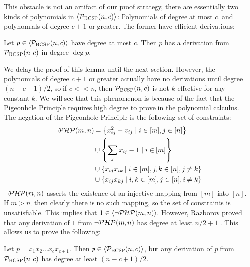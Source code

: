 This obstacle is not an artifact of our proof strategy, there are essentially two kinds of polynomials in $\langle \mathcal P_{\textsc{BCSP}}(n,c) \rangle$:
Polynomials of degree at most $c$, and polynomials of degree $c+1$ or greater. 
The former have efficient derivations:
\begin{lemma}\label{lem:bcsp-lowdeg}
Let $p \in \langle \mathcal P_{\textsc{BCSP}}(n,c) \rangle$ have degree at most $c$. Then $p$ has a derivation from $\mathcal P_{\textsc{BCSP}}(n,c)$ in degree $\deg p$.
\end{lemma}
We delay the proof of this lemma until the next section. 
However, the polynomials of degree $c+1$ or greater actually have no derivations until degree $(n-c+1)/2$, so if $c << n$, then $\mathcal P_{\textsc{BCSP}}(n,c)$ is not $k$-effective for any constant $k$.
We will see that this phenomenon is because of the fact that the Pigeonhole Principle requires high degree to prove in the polynomial calculus. 
The negation of the Pigeonhole Principle is the following set of constraints:
\begin{align*}
\neg\mathcal P\mathcal H\mathcal P(m,n) &= \left\{x_{ij}^2 - x_{ij} \mid i \in [m], j \in [n]\right\} \\
&\cup \left\{\sum_j x_{ij} - 1 \mid i \in [m]\right\} \\
&\cup \left\{x_{ij}x_{ik} \mid i \in [m], j,k \in [n], j \neq k\right\} \\
&\cup \left\{x_{ij}x_{kj} \mid i,k \in [m], j \in [n], i \neq k\right\}
\end{align*}
$\neg\mathcal P\mathcal H\mathcal P(m,n)$ asserts the existence of an injective mapping from $[m]$ into $[n]$. If $m > n$, then clearly there is no such mapping, so the set of constraints is unsatisfiable. This implies that $1 \in \langle \neg\mathcal P\mathcal H\mathcal P(m,n) \rangle$. However, Razborov proved that any derivation of $1$ from $\neg\mathcal P\mathcal H\mathcal P(m,n)$ has degree at least $n/2 + 1$ \cite{Raz98}.
This allows us to prove the following:
\begin{lemma}\label{lem:bcsp-highdeg-hard}
Let $p = x_1x_2\dots x_c x_{c+1}$. Then $p \in \langle \mathcal P_{\textsc{BCSP}}(n,c) \rangle$, but any derivation of $p$ from $\mathcal P_{\textsc{BCSP}}(n,c)$ has degree at least $(n-c+1)/2$. 
\end{lemma}
